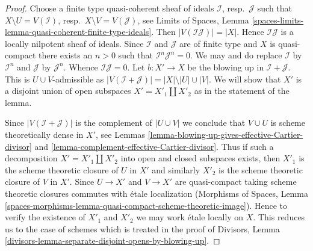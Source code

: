 \begin{proof}
Choose a finite type quasi-coherent sheaf of ideals $\mathcal{I}$,
resp.\ $\mathcal{J}$ such that $X \setminus U = V(\mathcal{I})$,
resp.\ $X \setminus V = V(\mathcal{J})$, see
Limits of Spaces, Lemma
\ref{spaces-limits-lemma-quasi-coherent-finite-type-ideals}.
Then $|V(\mathcal{I}\mathcal{J})| = |X|$. Hence
$\mathcal{I}\mathcal{J}$ is a locally nilpotent sheaf of ideals.
Since $\mathcal{I}$ and $\mathcal{J}$ are of finite type and $X$
is quasi-compact there exists an $n > 0$ such that
$\mathcal{I}^n \mathcal{J}^n = 0$. We may and do replace $\mathcal{I}$
by $\mathcal{I}^n$ and $\mathcal{J}$ by $\mathcal{J}^n$. Whence
$\mathcal{I} \mathcal{J} = 0$. Let $b : X' \to X$ be the blowing
up in $\mathcal{I} + \mathcal{J}$. This is $U \cup V$-admissible
as $|V(\mathcal{I} + \mathcal{J})| = |X| \setminus |U| \cup |V|$.
We will show that $X'$ is a disjoint union of open subspaces
$X' = X'_1 \amalg X'_2$ as in the statement of the lemma.

\medskip\noindent
Since $|V(\mathcal{I} + \mathcal{J})|$ is the complement of
$|U \cup V|$ we conclude that $V \cup U$ is scheme theoretically
dense in $X'$, see
Lemmas \ref{lemma-blowing-up-gives-effective-Cartier-divisor} and
\ref{lemma-complement-effective-Cartier-divisor}.
Thus if such a decomposition $X' = X'_1 \amalg X'_2$
into open and closed subspaces exists, then $X'_1$ is the
scheme theoretic closure of $U$ in $X'$ and similarly $X'_2$ is
the scheme theoretic closure of $V$ in $X'$. Since $U \to X'$
and $V \to X'$ are quasi-compact taking scheme theoretic
closures commutes with \'etale localization (Morphisms of Spaces,
Lemma \ref{spaces-morphisms-lemma-quasi-compact-scheme-theoretic-image}).
Hence to verify the existence of $X'_1$ and $X'_2$ we may work \'etale
locally on $X$. This reduces us to the case of schemes which is
treated in the proof of Divisors, Lemma
\ref{divisors-lemma-separate-disjoint-opens-by-blowing-up}.
\end{proof}


























